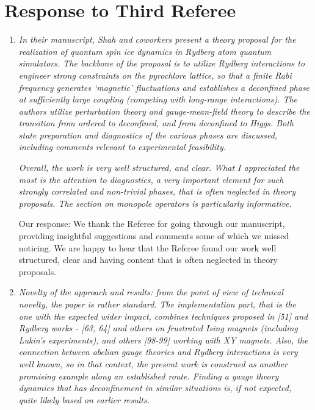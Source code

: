 \documentclass[
onecolumn,
superscriptaddress,
longbibliography,
nofootinbib,
 amsmath,amssymb,
 aps,
prb
]{revtex4-2}
\newcommand{\response}[1]{\textcolor{Mulberry}{#1}}
\begin{document}
\noindent\makebox[\linewidth]{\rule{\textwidth}{0.4pt}}


\section{Response to Third Referee}
\begin{enumerate}
    \item \textit{In their manuscript, Shah and coworkers present a theory proposal for
the realization of quantum spin ice dynamics in Rydberg atom quantum
simulators. The backbone of the proposal is to utilize Rydberg
interactions to engineer strong constraints on the pyrochlore lattice,
so that a finite Rabi frequency generates `magnetic' fluctuations and
establishes a deconfined phase at sufficiently large coupling
(competing with long-range interactions). The authors utilize
perturbation theory and gauge-mean-field theory to describe the
transition from ordered to deconfined, and from deconfined to Higgs.
Both state preparation and diagnostics of the various phases are
discussed, including comments relevant to experimental feasibility.}

\textit{Overall, the work is very well structured, and clear. What I
appreciated the most is the attention to diagnostics, a very important
element for such strongly correlated and non-trivial phases, that is
often neglected in theory proposals. The section on monopole operators
is particularly informative.}

\response{Our response: We thank the Referee for going through our manuscript, providing insightful suggestions and comments some of which we missed noticing. We are happy to hear that the Referee found our work well structured, clear and having content that is often neglected in theory proposals.}

\item \textit{Novelty of the approach and results: from the point of view of
technical novelty, the paper is rather standard. The implementation
part, that is the one with the expected wider impact, combines
techniques proposed in [51] and Rydberg works - [63, 64] and others on
frustrated Ising magnets (including Lukin's experiments), and others
[98-99] working with XY magnets. Also, the connection between abelian
gauge theories and Rydberg interactions is very well known, so in that
context, the present work is construed as another promising example
along an established route. Finding a gauge theory dynamics that has
deconfinement in similar situations is, if not expected, quite likely
based on earlier results.}


\end{enumerate}
\end{document}
